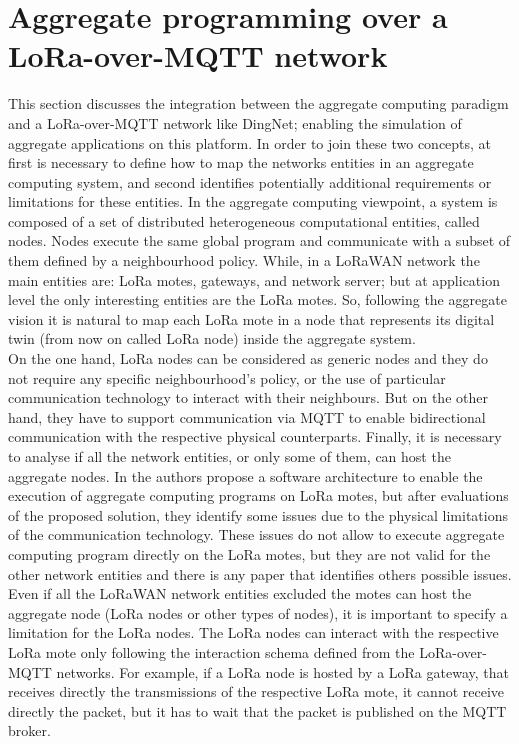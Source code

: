 \section{Aggregate programming over a LoRa-over-MQTT network}
\label{sec:contributionACOverDingNet}
This section discusses the integration between the aggregate computing paradigm and a LoRa-over-MQTT network like DingNet; enabling the simulation of aggregate applications on this platform.
In order to join these two concepts, at first is necessary to define how to map the networks entities in an aggregate computing system, and second identifies potentially additional requirements or limitations for these entities.
In the aggregate computing viewpoint, a system is composed of a set of distributed heterogeneous computational entities, called nodes. Nodes execute the same global program and communicate with a subset of them defined by a neighbourhood policy. 
While, in a LoRaWAN network the main entities are: LoRa motes, gateways, and network server; but at application level the only interesting entities are the LoRa motes.
So, following the aggregate vision it is natural to map each LoRa mote in a node that represents its digital twin (from now on called LoRa node) inside the aggregate system.
\\On the one hand, LoRa nodes can be considered as generic nodes and they do not require any specific neighbourhood's policy, or the use of particular communication technology to interact with their neighbours. 
But on the other hand, they have to support communication via MQTT to enable bidirectional communication with the respective physical counterparts.
Finally, it is necessary to analyse if all the network entities, or only some of them, can host the aggregate nodes.
In \cite{CCNCPS2018} the authors propose a software architecture to enable the execution of aggregate computing programs on LoRa motes, but after evaluations of the proposed solution, they identify some issues due to the physical limitations of the communication technology. 
These issues do not allow to execute aggregate computing program directly on the LoRa motes, but they are not valid for the other network entities and there is any paper that identifies others possible issues.
Even if all the LoRaWAN network entities excluded the motes can host the aggregate node (LoRa nodes or other types of nodes), it is important to specify a limitation for the LoRa nodes. 
The LoRa nodes can interact with the respective LoRa mote only following the interaction schema defined from the LoRa-over-MQTT networks. 
For example, if a LoRa node is hosted by a LoRa gateway, that receives directly the transmissions of the respective LoRa mote, it cannot receive directly the packet, but it has to wait that the packet is published on the MQTT broker.

